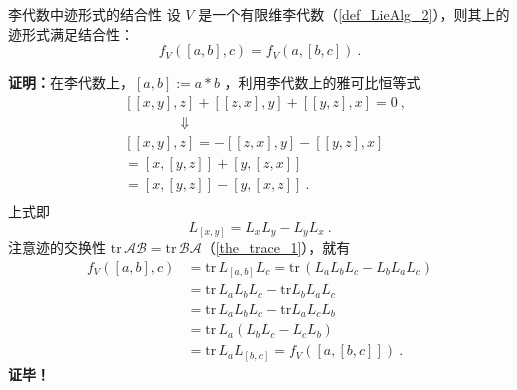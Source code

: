 \begin{theorem}{李代数中迹形式的结合性}\label{the_STAlg_1}
设 $V$ 是一个有限维李代数（\autoref{def_LieAlg_2}），则其上的迹形式满足结合性：
\begin{equation}
f_V([a,b],c)=f_V(a,[b,c])~.
\end{equation}
\end{theorem}
\textbf{证明：}在李代数上，$[a,b]:=a*b$ ，利用李代数上的雅可比恒等式
\begin{equation}
\begin{aligned}
&[[x,y],z]+[[z,x],y]+[[y,z],x]=0~,\\
&\qquad\qquad\Downarrow\\
&[[x,y],z]=-[[z,x],y]-[[y,z],x]\\
&=[x,[y,z]]+[y,[z,x]]\\
&=[x,[y,z]]-[y,[x,z]]~.\\
\end{aligned}
\end{equation}
上式即
\begin{equation}
L_{[x,y]}=L_xL_y-L_yL_x~.
\end{equation}
注意迹的交换性 $\mathrm{tr}\, \mathcal A\mathcal B=\mathrm{tr}\, \mathcal B\mathcal A$（\autoref{the_trace_1}），就有
\begin{equation}
\begin{aligned}
f_V([a,b],c)&=\mathrm{tr}\,L_{[a,b]}L_c=\mathrm{tr}\,(L_aL_bL_c-L_bL_aL_c)\\
&=\mathrm{tr}\,L_aL_bL_c-\mathrm{tr}L_bL_aL_c\\
&=\mathrm{tr}\,L_aL_bL_c-\mathrm{tr}L_aL_cL_b\\
&=\mathrm{tr}\,L_a(L_bL_c-L_cL_b)\\
&=\mathrm{tr}\,L_aL_{[b,c]}=f_V([a,[b,c]])~.
\end{aligned}
\end{equation}
\textbf{证毕！}

